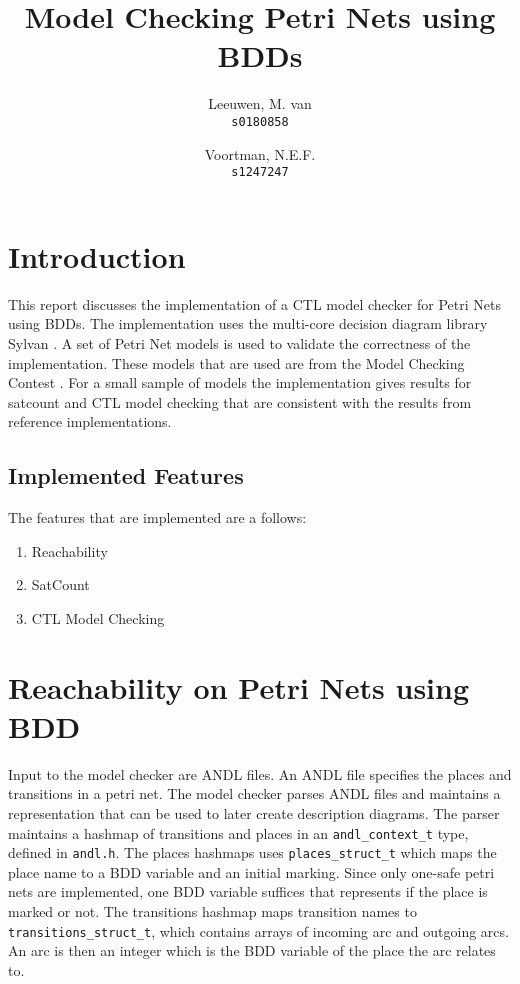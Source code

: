 \documentclass[twoside, a4paper]{article}
\title{Model Checking Petri Nets using BDDs}
\author{Leeuwen, M. van\\
  \texttt{s0180858}\\
  \and
  Voortman, N.E.F.\\
  \texttt{s1247247}
}
\begin{document}
\maketitle

\section{Introduction}
This report discusses the implementation of a CTL model checker for Petri Nets using BDDs. The implementation uses the multi-core decision diagram library Sylvan \parencite{sylvan}. A set of Petri Net models is used to validate the correctness of the implementation. These models that are used are from the Model Checking Contest \parencite{mcc:2017}. For a small sample of models the implementation gives results for satcount and CTL model checking that are consistent with the results from reference implementations.

\subsection{Implemented Features}

The features that are implemented are a follows:
\begin{enumerate}
\item Reachability
\item SatCount
\item CTL Model Checking
\end{enumerate}
\section{Reachability on Petri Nets using BDD}
Input to the model checker are ANDL files. An ANDL file specifies the places and transitions in a petri net. The model checker parses ANDL files and maintains a representation that can be used to later create description diagrams. The parser maintains a hashmap of transitions and places in an \texttt{andl\_context\_t} type, defined in \texttt{andl.h}. The places hashmaps uses \texttt{places\_struct\_t} which maps the place name to a BDD variable and an initial marking. Since only one-safe petri nets are implemented, one BDD variable suffices that represents if the place is marked or not.  The transitions hashmap maps transition names to \texttt{transitions\_struct\_t}, which contains arrays of incoming arc and outgoing arcs. An arc is then an integer which is the BDD variable of the place the arc relates to.
\end{document}
